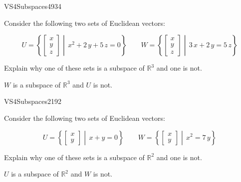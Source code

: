 \begin{exercise}{VS4}{Subspaces}{4934} 
\begin{exerciseStatement} 

Consider the following two sets of Euclidean vectors: 

 \[
          U=\left\{ \left[\begin{array}{c}
x \\
y \\
z
\end{array}\right] \middle|\,x^{2} + 2 \, y + 5 \, z = 0\right\} \hspace{2em}  W=\left\{ \left[\begin{array}{c}
x \\
y \\
z
\end{array}\right] \middle|\,3 \, x + 2 \, y = 5 \, z\right\}
    \] 

 Explain why one of these sets is a subspace of \(\mathbb{R}^3\) and one is not. 

 \end{exerciseStatement}
 \begin{exerciseAnswer} 

\(W\) is a subspace of \(\mathbb{R}^3\) and \(U\) is not.

 \end{exerciseAnswer}
 \end{exercise}


\begin{exercise}{VS4}{Subspaces}{2192} 
\begin{exerciseStatement} 

Consider the following two sets of Euclidean vectors: 

 \[
          U=\left\{ \left[\begin{array}{c}
x \\
y
\end{array}\right] \middle|\,x + y = 0\right\} \hspace{2em}  W=\left\{ \left[\begin{array}{c}
x \\
y
\end{array}\right] \middle|\,x^{2} = 7 \, y\right\}
    \] 

 Explain why one of these sets is a subspace of \(\mathbb{R}^2\) and one is not. 

 \end{exerciseStatement}
 \begin{exerciseAnswer} 

\(U\) is a subspace of \(\mathbb{R}^2\) and \(W\) is not.

 \end{exerciseAnswer}
 \end{exercise}


